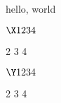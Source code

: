 \documentclass{amsart}
\begin{document}
hello, world

$\X 1 2 3 4$

 2 3 4

$\Y 1 2 3 4$

 2 3 4
\end{document}
